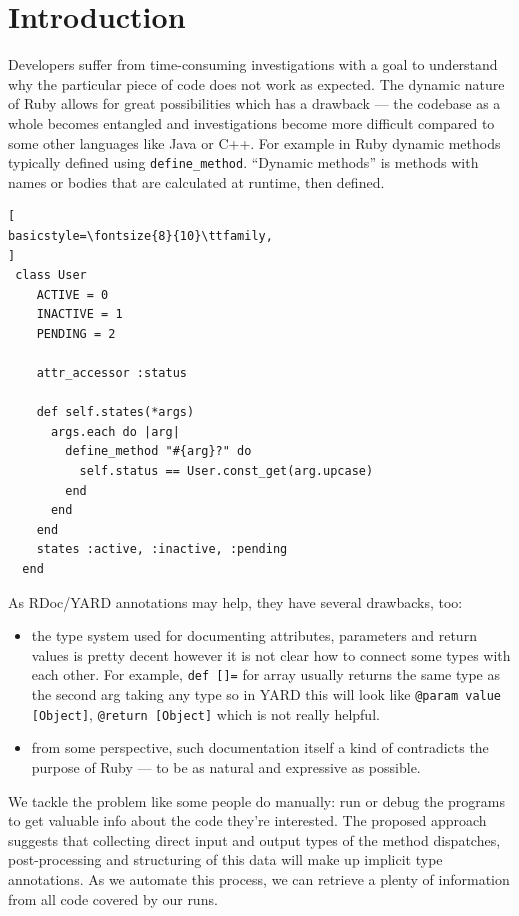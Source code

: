 \documentclass[conference]{IEEEtran}
\begin{document}
\section{Introduction}
Developers suffer from time-consuming investigations with a goal to understand why the particular piece of code does not
work as expected. The dynamic nature of Ruby allows for great possibilities which has a drawback — the codebase as a
whole becomes entangled and investigations become more difficult compared to some other languages like Java or C++. For example in Ruby dynamic methods typically defined using \texttt{define\_method}. “Dynamic methods” is methods with names or bodies that are calculated at runtime, then defined\cite{gradual_type}.
\begin{lstlisting}[
basicstyle=\fontsize{8}{10}\ttfamily,
]
 class User
    ACTIVE = 0
    INACTIVE = 1
    PENDING = 2

    attr_accessor :status

    def self.states(*args)
      args.each do |arg|
        define_method "#{arg}?" do
          self.status == User.const_get(arg.upcase)
        end
      end
    end
    states :active, :inactive, :pending
  end
\end{lstlisting}
As RDoc/YARD annotations may help, they have several drawbacks, too:


\begin{itemize}  
\item the type system used for documenting attributes, parameters and return values is pretty decent however it is not
  clear how to connect some types with each other. For example, \texttt{def []=} for array usually returns the same type
  as the second arg taking any type so in YARD this will look like \texttt{@param value [Object]}, \texttt{@return
  [Object]} which is not really helpful.
\item from some perspective, such documentation itself a kind of contradicts the purpose of Ruby — to be as natural
  and expressive as possible. 
\end{itemize}

We tackle the problem like some people do manually: run or debug the programs to get valuable info about the code
they're interested. The proposed approach suggests that collecting direct input and output types of the method dispatches, post-processing and structuring of this data will make up implicit type annotations. As we automate this process, we can retrieve a plenty of information from all code covered by our runs.
\end{document}
